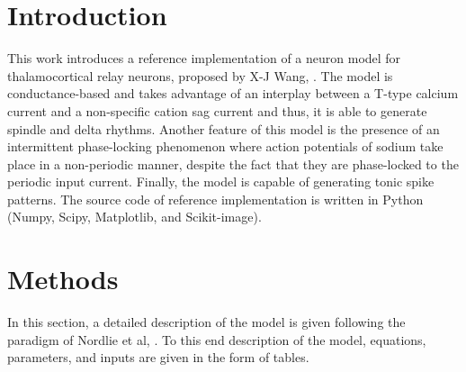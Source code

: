 \documentclass[10pt,a4paper,onecolumn]{article}
\begin{document}
\section{Introduction}\label{introduction}

This work introduces a reference implementation of a neuron model for
thalamocortical relay neurons, proposed by X-J Wang, \cite{wang:1994}.
The model is conductance-based and takes advantage of an interplay between
a T-type calcium current and a non-specific cation sag current and thus, it
is able to generate spindle and delta rhythms. Another feature of this model
is the presence of an intermittent phase-locking phenomenon where action 
potentials of sodium take place in a non-periodic manner, despite the fact
that they are phase-locked to the periodic input current. Finally, the model
is capable of generating tonic spike patterns. The source code of
reference implementation is written in Python (Numpy, Scipy, Matplotlib,
and Scikit-image).


\section{Methods}\label{methods}

In this section, a detailed description of the model is given following 
the paradigm of Nordlie et al, \cite{nordlie:2009}. To this end description of
the model, equations, parameters, and inputs are given in the form of tables. 
\end{document}
